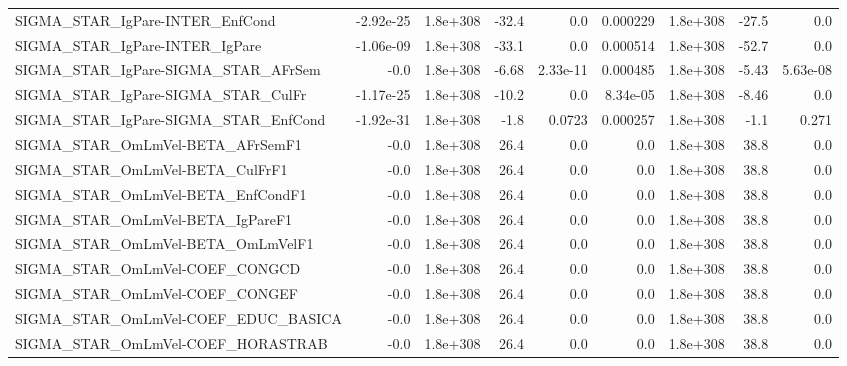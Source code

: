 \begin{tabular}{lrrrrrrrr}
SIGMA\_STAR\_IgPare-INTER\_EnfCond       &   -2.92e-25 &     1.8e+308 &   -32.4 &      0.0 &   0.000229 &    1.8e+308 &        -27.5 &           0.0 \\
SIGMA\_STAR\_IgPare-INTER\_IgPare        &   -1.06e-09 &     1.8e+308 &   -33.1 &      0.0 &   0.000514 &    1.8e+308 &        -52.7 &           0.0 \\
SIGMA\_STAR\_IgPare-SIGMA\_STAR\_AFrSem   &        -0.0 &     1.8e+308 &   -6.68 & 2.33e-11 &   0.000485 &    1.8e+308 &        -5.43 &      5.63e-08 \\
SIGMA\_STAR\_IgPare-SIGMA\_STAR\_CulFr    &   -1.17e-25 &     1.8e+308 &   -10.2 &      0.0 &   8.34e-05 &    1.8e+308 &        -8.46 &           0.0 \\
SIGMA\_STAR\_IgPare-SIGMA\_STAR\_EnfCond  &   -1.92e-31 &     1.8e+308 &    -1.8 &   0.0723 &   0.000257 &    1.8e+308 &         -1.1 &         0.271 \\
SIGMA\_STAR\_OmLmVel-BETA\_AFrSemF1      &        -0.0 &     1.8e+308 &    26.4 &      0.0 &        0.0 &    1.8e+308 &         38.8 &           0.0 \\
SIGMA\_STAR\_OmLmVel-BETA\_CulFrF1       &        -0.0 &     1.8e+308 &    26.4 &      0.0 &        0.0 &    1.8e+308 &         38.8 &           0.0 \\
SIGMA\_STAR\_OmLmVel-BETA\_EnfCondF1     &        -0.0 &     1.8e+308 &    26.4 &      0.0 &        0.0 &    1.8e+308 &         38.8 &           0.0 \\
SIGMA\_STAR\_OmLmVel-BETA\_IgPareF1      &        -0.0 &     1.8e+308 &    26.4 &      0.0 &        0.0 &    1.8e+308 &         38.8 &           0.0 \\
SIGMA\_STAR\_OmLmVel-BETA\_OmLmVelF1     &        -0.0 &     1.8e+308 &    26.4 &      0.0 &        0.0 &    1.8e+308 &         38.8 &           0.0 \\
SIGMA\_STAR\_OmLmVel-COEF\_CONGCD        &        -0.0 &     1.8e+308 &    26.4 &      0.0 &        0.0 &    1.8e+308 &         38.8 &           0.0 \\
SIGMA\_STAR\_OmLmVel-COEF\_CONGEF        &        -0.0 &     1.8e+308 &    26.4 &      0.0 &        0.0 &    1.8e+308 &         38.8 &           0.0 \\
SIGMA\_STAR\_OmLmVel-COEF\_EDUC\_BASICA   &        -0.0 &     1.8e+308 &    26.4 &      0.0 &        0.0 &    1.8e+308 &         38.8 &           0.0 \\
SIGMA\_STAR\_OmLmVel-COEF\_HORASTRAB     &        -0.0 &     1.8e+308 &    26.4 &      0.0 &        0.0 &    1.8e+308 &         38.8 &           0.0 \\

\end{tabular}
